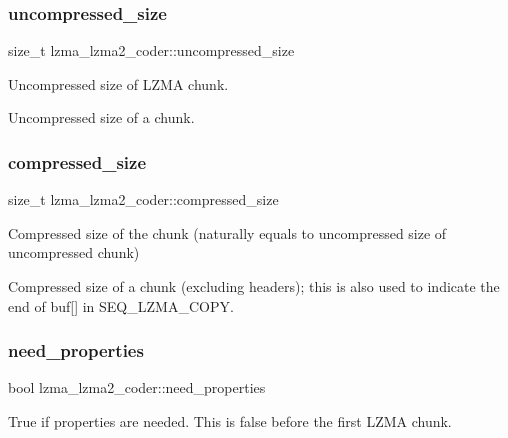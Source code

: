 \mbox{\label{structlzma__lzma2__coder_a1558ad9a752833c358853db74ae0e478}} 
\subsubsection{uncompressed\+\_\+size}
{\footnotesize\ttfamily size\+\_\+t lzma\+\_\+lzma2\+\_\+coder\+::uncompressed\+\_\+size}



Uncompressed size of L\+Z\+MA chunk. 

Uncompressed size of a chunk. \mbox{\label{structlzma__lzma2__coder_ae96a9e28e8d7617be943a345d4ceeda9}} 
\subsubsection{compressed\+\_\+size}
{\footnotesize\ttfamily size\+\_\+t lzma\+\_\+lzma2\+\_\+coder\+::compressed\+\_\+size}

Compressed size of the chunk (naturally equals to uncompressed size of uncompressed chunk)

Compressed size of a chunk (excluding headers); this is also used to indicate the end of buf[] in S\+E\+Q\+\_\+\+L\+Z\+M\+A\+\_\+\+C\+O\+PY. \mbox{\label{structlzma__lzma2__coder_a4e9424a68320a3725615e07ba65fbbe9}} 
\subsubsection{need\+\_\+properties}
{\footnotesize\ttfamily bool lzma\+\_\+lzma2\+\_\+coder\+::need\+\_\+properties}

True if properties are needed. This is false before the first L\+Z\+MA chunk. \mbox{\label{structlzma__lzma2__coder_ae76f251ce4e5a72efc80f048a63ed694}} 
